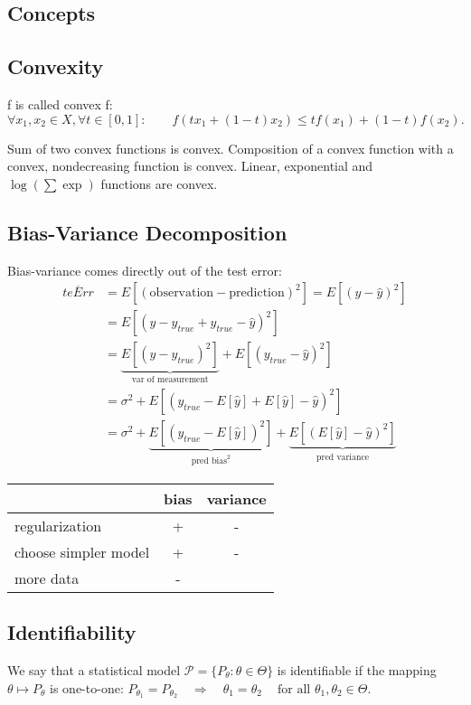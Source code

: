 \documentclass[10pt,a4paper,landscape]{article}
\begin{document}
\begin{multicols*}{4}
\section{Concepts}

\subsection{Convexity}
f is called convex f: $\forall x_1, x_2 \in X, \forall t \in [0, 1]: \qquad f(tx_1+(1-t)x_2)\leq t f(x_1)+(1-t)f(x_2).$

Sum of two convex functions is convex. Composition of a convex function with a convex, nondecreasing function is convex. Linear, exponential and $\log(\sum \exp)$ functions are convex.

\subsection{Bias-Variance Decomposition}

Bias-variance comes directly out of the test error:
 \begin{align*}
 \overline{teErr}
 &= E[(\text{observation} - \text{prediction})^2] = E[(y - \hat{y})^2] \\
 &= E[(y - y_{true} + y_{true} - \hat{y})^2] \\
 &=\underbrace{E[(y - y_{true})^2]}_{\text{var of measurement}} + E[(y_{true} - \hat{y})^2] \\
 &=\sigma^2 + E[(y_{true} - E[\hat{y}] + E[\hat{y}] - \hat{y})^2] \\
 &=\sigma^2 + \underbrace{E[(y_{true} - E[\hat{y}])^2]}_{\text{pred bias}^2} +\underbrace{E[(E[\hat{y}] - \hat{y})^2]}_{\text{pred variance}}
\end{align*}

\begin{tabular}{ l || c | c }
                          & bias & variance \\
  \hline
  regularization          & +    & - \\
  choose simpler model    & +    & - \\
  more data               & -    & \\
  \hline
\end{tabular}

\subsection{Identifiability}
We say that a statistical model $\mathcal{P} = \{P_\theta: \theta \in \Theta\}$ is identifiable if the mapping $\theta \mapsto P_\theta$ is one-to-one:
$P_{\theta_1}=P_{\theta_2} \quad\Rightarrow\quad \theta_1=\theta_2 \quad\ \text{for all } \theta_1,\theta_2\in\Theta.$


\end{multicols*}
\end{document}
